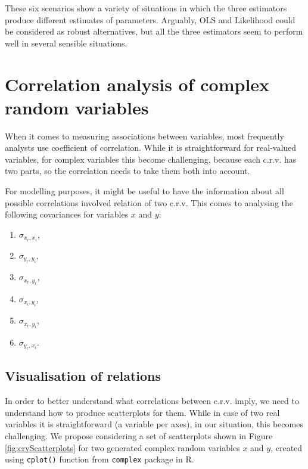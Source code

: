 \documentclass[
]{book}
\providecommand{\tightlist}{%
  \setlength{\itemsep}{0pt}\setlength{\parskip}{0pt}}
\begin{document}
These six scenarios show a variety of situations in which the three estimators produce different estimates of parameters. Arguably, OLS and Likelihood could be considered as robust alternatives, but all the three estimators seem to perform well in several sensible situations.

\hypertarget{correlationAnalysis}{%
\chapter{Correlation analysis of complex random variables}\label{correlationAnalysis}}

When it comes to measuring associations between variables, most frequently analysts use coefficient of correlation. While it is straightforward for real-valued variables, for complex variables this become challenging, because each c.r.v. has two parts, so the correlation needs to take them both into account.

For modelling purposes, it might be useful to have the information about all possible correlations involved relation of two c.r.v. This comes to analysing the following covariances for variables \(x\) and \(y\):

\begin{enumerate}
\def\labelenumi{\arabic{enumi}.}
\tightlist
\item
  \(\sigma_{x_r,x_i}\),
\item
  \(\sigma_{y_r,y_i}\),
\item
  \(\sigma_{x_r,y_r}\),
\item
  \(\sigma_{x_i,y_i}\),
\item
  \(\sigma_{x_r,y_i}\),
\item
  \(\sigma_{y_r,x_i}\).
\end{enumerate}

\hypertarget{correlationVisual}{%
\section{Visualisation of relations}\label{correlationVisual}}

In order to better understand what correlations between c.r.v. imply, we need to understand how to produce scatterplots for them. While in case of two real variables it is straightforward (a variable per axes), in our situation, this becomes challenging. We propose considering a set of scatterplots shown in Figure \ref{fig:crvScatterplots} for two generated complex random variables \(x\) and \(y\), created using \texttt{cplot()} function from \texttt{complex} package in R.
\end{document}
